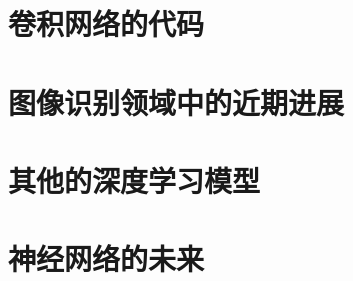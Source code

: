 \section{卷积网络的代码}
\label{sec:the_code_for_our_convolutional_networks}

\section{图像识别领域中的近期进展}
\label{sec:recent_progress_in_image_recognition}

\section{其他的深度学习模型}
\label{sec:other_approaches_to_deep_neural_nets}

\section{神经网络的未来}
\label{sec:on_the_future_of_neural_networks}
